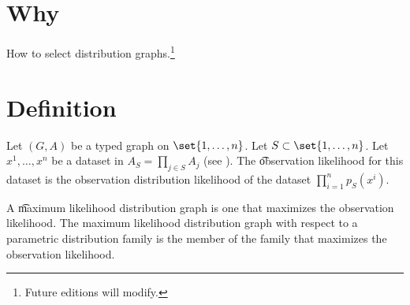 

\section*{Why}

How to select distribution graphs.\footnote{Future editions will modify.}

\section*{Definition}

Let $(G, A)$ be a typed graph on $\set{1, \dots , n}$.
Let $S \subset \set{1, \dots , n}$.
Let $x^1, \dots , x^n$ be a dataset in $A_S = \prod_{j \in S} A_j$ (see ).
The \t{observation likelihood} for this dataset is the observation distribution likelihood of the dataset $\prod_{i =1}^{n} p_S(x^i)$.

A \t{maximum likelihood distribution graph} is one that maximizes the observation likelihood.
The maximum likelihood distribution graph with respect to a parametric distribution family is the member of the family that maximizes the observation likelihood.

\blankpage